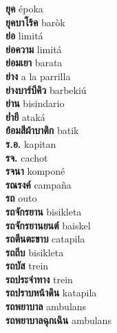 \textbf{ ยุค  } époka \\
\textbf{ ยุคบาโร้ค  } baròk \\
\textbf{ ย่อ  } limitá \\
\textbf{ ย่อความ  } limitá \\
\textbf{ ย่อมเยา  } barata \\
\textbf{ ย่าง  } a la parrilla \\
\textbf{ ย่างบาร์บีคิว  } barbekiú \\
\textbf{ ย่าน  } bisindario \\
\textbf{ ย่ำยี  } ataká \\
\textbf{ ย้อมสีผ้าบาติก  } batik \\
\textbf{ ร.อ.  } kapitan \\
\textbf{ รจ.  } cachot \\
\textbf{ รจนา  } komponé \\
\textbf{ รณรงค์  } campaña \\
\textbf{ รถ  } outo \\
\textbf{ รถจักรยาน  } bisikleta \\
\textbf{ รถจักรยานยนต์  } baiskel \\
\textbf{ รถตีนตะขาบ  } catapila \\
\textbf{ รถถีบ  } bisikleta \\
\textbf{ รถบัส  } trein \\
\textbf{ รถประจำทาง  } trein \\
\textbf{ รถปราบหน้าดิน  } katapila \\
\textbf{ รถพยาบาล  } ambulans \\
\textbf{ รถพยาบาลฉุกเฉิน  } ambulans \\
